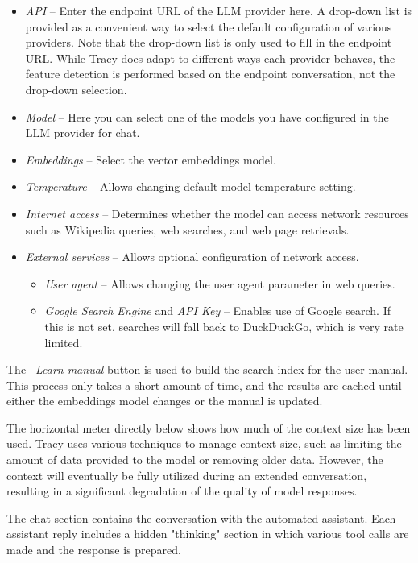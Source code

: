 \documentclass[hidelinks,titlepage,a4paper,twoside]{article}
\begin{document}
\begin{itemize}
\item \emph{API} -- Enter the endpoint URL of the LLM provider here. A drop-down list is provided as a convenient way to select the default configuration of various providers. Note that the drop-down list is only used to fill in the endpoint URL. While Tracy does adapt to different ways each provider behaves, the feature detection is performed based on the endpoint conversation, not the drop-down selection.
\item \emph{Model} -- Here you can select one of the models you have configured in the LLM provider for chat.
\item \emph{Embeddings} -- Select the vector embeddings model.
\item \emph{Temperature} -- Allows changing default model temperature setting.
\item \emph{Internet access} -- Determines whether the model can access network resources such as Wikipedia queries, web searches, and web page retrievals.
\item \emph{External services} -- Allows optional configuration of network access.
\begin{itemize}
\item \emph{User agent} -- Allows changing the user agent parameter in web queries.
\item \emph{Google Search Engine} and \emph{API Key} -- Enables use of Google search. If this is not set, searches will fall back to DuckDuckGo, which is very rate limited.
\end{itemize}
\end{itemize}

The \emph{\faBook{}~Learn manual} button is used to build the search index for the user manual. This process only takes a short amount of time, and the results are cached until either the embeddings model changes or the manual is updated.

The horizontal meter directly below shows how much of the context size has been used. Tracy uses various techniques to manage context size, such as limiting the amount of data provided to the model or removing older data. However, the context will eventually be fully utilized during an extended conversation, resulting in a significant degradation of the quality of model responses.

The chat section contains the conversation with the automated assistant. Each assistant reply includes a hidden "thinking" section in which various tool calls are made and the response is prepared.
\end{document}
